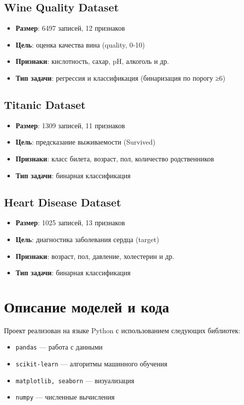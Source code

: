 \documentclass[a4paper]{article}
\begin{document}
\subsection{Wine Quality Dataset}
\begin{itemize}
    \item \textbf{Размер}: 6497 записей, 12 признаков
    \item \textbf{Цель}: оценка качества вина (quality, 0-10)
    \item \textbf{Признаки}: кислотность, сахар, pH, алкоголь и др.
    \item \textbf{Тип задачи}: регрессия и классификация (бинаризация по порогу ≥6)
\end{itemize}

\subsection{Titanic Dataset}
\begin{itemize}
    \item \textbf{Размер}: 1309 записей, 11 признаков
    \item \textbf{Цель}: предсказание выживаемости (Survived)
    \item \textbf{Признаки}: класс билета, возраст, пол, количество родственников
    \item \textbf{Тип задачи}: бинарная классификация
\end{itemize}

\subsection{Heart Disease Dataset}
\begin{itemize}
    \item \textbf{Размер}: 1025 записей, 13 признаков
    \item \textbf{Цель}: диагностика заболевания сердца (target)
    \item \textbf{Признаки}: возраст, пол, давление, холестерин и др.
    \item \textbf{Тип задачи}: бинарная классификация
\end{itemize}

\section{Описание моделей и кода}

Проект реализован на языке Python с использованием следующих библиотек:
\begin{itemize}
    \item \texttt{pandas} — работа с данными
    \item \texttt{scikit-learn} — алгоритмы машинного обучения
    \item \texttt{matplotlib, seaborn} — визуализация
    \item \texttt{numpy} — численные вычисления
\end{itemize}
\end{document}
